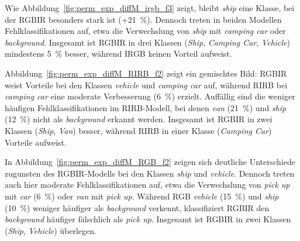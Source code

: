 %     

Wie Abbildung~\ref{fig:perm_exp_diffM_irgb_f3} zeigt, bleibt \textit{ship} eine Klasse, bei der RGBIR besonders stark ist (+21~\%). Dennoch treten in beiden Modellen Fehlklassifikationen auf, etwa die Verwechslung von \textit{ship} mit \textit{camping car} oder \textit{background}. Insgesamt ist RGBIR in drei Klassen (\textit{Ship}, \textit{Camping Car}, \textit{Vehicle}) mindestens 5~\% besser, während IRGB keinen Vorteil aufweist.

%     

Abbildung~\ref{fig:perm_exp_diffM_RIRB_f2} zeigt ein gemischtes Bild: RGBIR weist Vorteile bei den Klassen \textit{vehicle} und \textit{camping car} auf, während RIRB bei \textit{camping car} eine moderate Verbesserung (6~\%) erzielt. Auffällig sind die weniger häufigen Fehlklassifikationen im RIRB-Modell, bei denen \textit{van} (21~\%) und \textit{ship} (12~\%) nicht als \textit{background} erkannt werden. Insgesamt ist RGBIR in zwei Klassen (\textit{Ship}, \textit{Van}) besser, während RIRB in einer Klasse (\textit{Camping Car}) Vorteile aufweist.

%     

In Abbildung~\ref{fig:perm_exp_diffM_RGB_f2} zeigen sich deutliche Unterschiede zugunsten des RGBIR-Modells bei den Klassen \textit{ship} und \textit{vehicle}. Dennoch treten auch hier moderate Fehlklassifikationen auf, etwa die Verwechslung von \textit{pick up} mit \textit{car} (6~\%) oder \textit{van} mit \textit{pick up}. Während RGB \textit{vehicle} (15~\%) und \textit{ship} (10~\%) weniger häufiger als \textit{background} verkennt, klassifiziert RGBIR den \textit{background} häufiger fälschlich als \textit{pick up}. Insgesamt ist RGBIR in zwei Klassen (\textit{Ship}, \textit{Vehicle}) überlegen.

